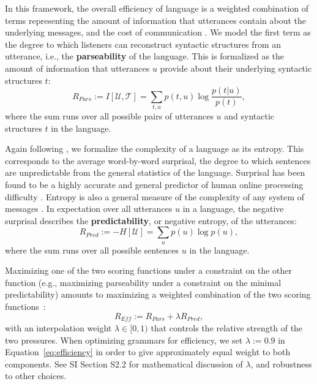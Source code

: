\documentclass[9pt,twocolumn,twoside,lineno]{pnas-new}
\newcommand{\key}[1]{\textbf{#1}}
\begin{document}
{In this framework, the overall efficiency of language is a weighted combination of terms representing the amount of information that utterances contain about the underlying messages, and the cost of communication  \cite{ferreri2003least,frank2012predicting,kemp2012kinship,regier2015word,zaslavsky2018efficient}. We model the first term as the 
 degree to which listeners can reconstruct syntactic structures from an utterance, i.e., the \key{parseability} of the language.
 This is formalized as the amount of information that utterances $u$ provide about their underlying syntactic structures $t$:
\begin{equation}
	R_{Pars} := I[\mathcal{U},\mathcal{T}] = \sum_{t,u} p(t,u) \log \frac{p(t|u)}{p(t)},
\end{equation}
where the sum runs over all possible pairs of utterances $u$ and syntactic structures $t$ in the language.

Again following \cite{ferreri2003least}, we formalize the complexity of a language as its entropy.
This corresponds to the average word-by-word surprisal, the degree to which sentences are unpredictable from the general statistics of the language.
Surprisal has been found to be a highly accurate and general predictor of human online processing difficulty \cite{hale2001probabilistic,levy2008expectation,smith2013effect}.
Entropy is also a general measure of the complexity of any system of messages \cite{shannon1948mathematical}.
In expectation over all utterances $u$ in a language, the negative surprisal describes the \key{predictability}, or negative entropy, of the utterances:
\begin{equation}
	R_{Pred} := - H[\mathcal{U}] = \sum_{u} p(u) \log p(u),
\end{equation}
where the sum runs over all possible sentences $u$ in the language.

Maximizing one of the two scoring functions under a constraint on the other function (e.g., maximizing parseability under a constraint on the minimal predictability) amounts to maximizing a weighted combination of the two scoring functions~\cite{ferreri2003least}:
\begin{equation}\label{eq:efficiency}
	R_{\textit{Eff}} := R_{\textit{Pars}} + \lambda R_\textit{Pred},
\end{equation}
with an interpolation weight $\lambda \in [0,1)$ that controls the relative strength of the two pressures.
When optimizing grammars for efficiency, we set $\lambda := 0.9$ in Equation~\ref{eq:efficiency} in order to give approximately equal weight to both components.
See SI Section S2.2 for mathematical discussion of $\lambda$, and robustness to other choices.

}
\end{document}
